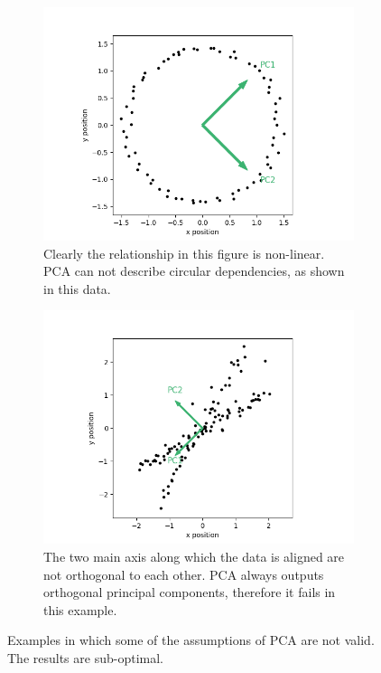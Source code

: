 \begin{figure}
	\centering
	\begin{subfigure}{0.8\linewidth}
		\includegraphics[width=\textwidth]{figs/pca_fails_nonlinear}
		\caption{Clearly the relationship in this figure is non-linear. PCA can not describe circular dependencies, as shown in this data.}
		\label{fig:pca_fails_nonlinear}
	\end{subfigure}
	\hfill
	\begin{subfigure}{0.8\linewidth}
		\includegraphics[width=\textwidth]{figs/pca_fails_nonorthogonal}
		\caption{The two main axis along which the data is aligned are not orthogonal to each other. PCA always outputs orthogonal principal components, therefore it fails in this example.}
		\label{fig:pca_fails_nonorthogonal}
	\end{subfigure}
	
	\caption{Examples in which some of the assumptions of PCA are not valid. The results are sub-optimal.}
	\label{fig:pca_fails}
\end{figure}

